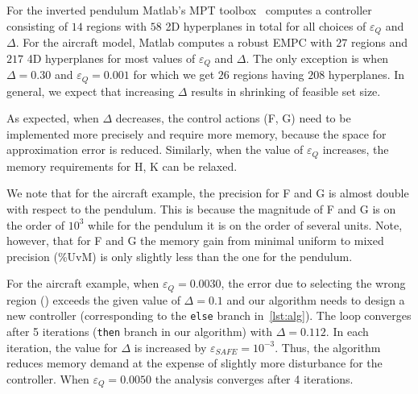 
For the inverted pendulum Matlab's MPT toolbox~\cite{matlabMPT} computes a controller
consisting of $14$ regions with $58$ 2D hyperplanes in total for all choices of $\varepsilon_Q$ and $\Delta$. 
For the aircraft model, Matlab computes a robust EMPC with
$27$ regions and $217$ 4D hyperplanes for most values of $\varepsilon_Q$ and $\Delta$. 
The only exception is when $\Delta=0.30$
and $\varepsilon_Q=0.001$ for which we get $26$ regions having $208$ hyperplanes.
In general, we expect that increasing $\Delta$ results in shrinking of feasible
set size.

As expected, when $\Delta$ decreases, the control actions (F, G) need to be implemented
more precisely and require more memory, because the space for approximation error
is reduced. Similarly, when the value of $\varepsilon_Q$ increases, the memory
requirements for H, K can be relaxed.

We note that for the aircraft example,
the precision for F and G is almost double with respect to the pendulum. This is
because the magnitude of F and G is on the order of $10^{3}$ while for the
pendulum it is on the order of several units. Note, however, that for F and G the memory gain
from minimal uniform to mixed precision (\%UvM) is only slightly less than the one for the pendulum.


For the aircraft example, when $\varepsilon_Q=0.0030$, the error due to selecting the wrong region (\maxUij) 
exceeds the given value of $\Delta=0.1$ and our algorithm
needs to design a new controller (corresponding to the \texttt{else} branch in~\autoref{lst:alg}). 
The loop converges after 5 iterations (\texttt{then}
branch in our algorithm) with $\Delta=0.112$. In each iteration, the value
for $\Delta$ is increased by $\varepsilon_{SAFE} = 10^{-3}$.
Thus, the algorithm reduces memory demand
at the expense of slightly more disturbance for the controller. When
$\varepsilon_Q=0.0050$ the analysis converges after 4 iterations.



